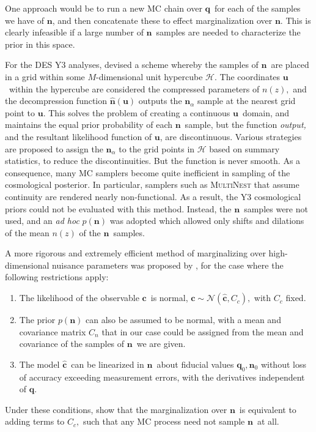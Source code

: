 \documentclass[linenumbers, onecolumn]{aastex63}
\newcommand{\vecc}{\ensuremath{\mathbf{c}}}
\newcommand{\vecq}{\ensuremath{\mathbf{q}}}
\newcommand{\vecn}{\ensuremath{\mathbf{n}}}
\newcommand{\vecu}{\ensuremath{\mathbf{u}}}
\newcommand{\hatc}{\ensuremath{\hat{\mathbf{c}}}}
\newcommand{\covm}{C}
\begin{document}
One approach would be to run a new MC chain over \vecq\ for each of the samples we have of \vecn, and then concatenate these to effect marginalization over \vecn.  This is clearly infeasible if a large number of \vecn\ samples are needed to characterize the prior in this space.

For the DES Y3 analyses, \citet{hyperrank} devised a scheme whereby
the samples of \vecn\ are placed in a grid within some $M$-dimensional
unit hypercube $\mathcal{H}$.  The coordinates \vecu\ within the hypercube
are considered the compressed parameters of $n(z),$ and the
decompression function
$\hat{\vecn}(\vecu)$ outputs the $\vecn_\alpha$ sample at the nearest grid point to
  \vecu.  This solves the problem of creating a continuous \vecu\
  domain, and maintains the equal prior probability of each \vecn\
  sample, but the function \emph{output,} and the resultant likelihood
  function of \vecu, are discontinuous.
Various strategies are proposed to assign the $\vecn_\alpha$ to the grid points in
$\mathcal{H}$ based on summary statistics, to reduce the
discontinuities.  But the function is never smooth.
As a consequence, many MC samplers become quite inefficient in
sampling of the cosmological posterior.  In particular, samplers such as \textsc{MultiNest} that assume continuity are rendered nearly non-functional.  As a result, the Y3 cosmological priors could not be evaluated with this method.  Instead, the \vecn\ samples were not used, and an \textit{ad hoc} $p(\vecn)$ was adopted which allowed only shifts and dilations of the mean $n(z)$ of the \vecn\ samples.

A more rigorous and extremely efficient method of marginalizing over high-dimensional nuisance parameters was proposed by \citet{hans}, for the case where the following restrictions apply:
\begin{enumerate}
\item The likelihood of the observable \vecc\ is normal, $\vecc \sim \mathcal{N}( \hatc, \covm_c),$ with $\covm_c$ fixed.
\item The prior $p(\vecn)$ can also be assumed to be normal, with a mean and covariance matrix $\covm_n$ that in our case could be assigned from the mean and covariance of the samples of \vecn\ we are given.
\item The model \hatc\ can be linearized in \vecn\ about fiducial values $\vecq_0, \vecn_0$ without loss of accuracy exceeding measurement errors, with the derivatives independent of \vecq.
\end{enumerate}
Under these conditions, \citet{hans} show that the marginalization over \vecn\ is equivalent to adding terms to $\covm_c,$ such that any MC process need not sample \vecn\ at all.
\end{document}
